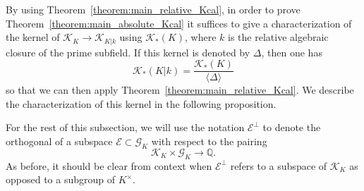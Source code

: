 \documentclass[12pt]{amsart}
\newcommand{\Qbb}{\mathbb{Q}}
\newcommand{\Gcal}{\mathcal{G}}
\newcommand{\Ecal}{\mathcal{E}}
\newcommand{\Kcal}{\mathcal{K}}
\theoremstyle{definition}
\begin{document}
By using Theorem~\ref{theorem:main_relative_Kcal}, in order to prove Theorem~\ref{theorem:main_absolute_Kcal} it suffices to give a characterization of the kernel of $\Kcal_{K} \to \Kcal_{K|k}$ using $\Kcal_{*}(K)$, where $k$ is the relative algebraic closure of the prime subfield.
If this kernel is denoted by $\Delta$, then one has
\[ \Kcal_{*}(K|k) = \frac{\Kcal_{*}(K)}{\langle \Delta \rangle} \]
so that we can then apply Theorem~\ref{theorem:main_relative_Kcal}.
We describe the characterization of this kernel in the following proposition.

For the rest of this subsection, we will use the notation $\Ecal^{\perp}$ to denote the orthogonal of a subspace $\Ecal \subset \Gcal_{K}$ with respect to the pairing
\[ \Kcal_{K} \times \Gcal_{K} \to \Qbb. \]
As before, it should be clear from context when $\Ecal^{\perp}$ refers to a subspace of $\Kcal_{K}$ as opposed to a subgroup of $K^{\times}$.
\end{document}
